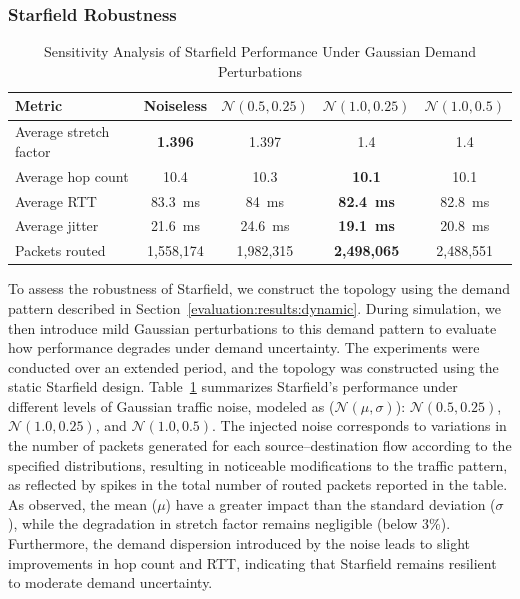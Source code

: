 \documentclass[acmsmall, screen]{acmart}
\begin{document}
\subsubsection{Starfield Robustness}\label{evaluation:results:robustness}
\begin{table}[!t]
\centering
\begin{tabular}{lcccc}
\toprule
Metric & Noiseless & $\mathcal{N}(0.5, 0.25)$ & $\mathcal{N}(1.0, 0.25)$ & $\mathcal{N}(1.0, 0.5)$ \\
\midrule
Average stretch factor & \textbf{1.396} & 1.397 & 1.4 & 1.4 \\
Average hop count & 10.4 & 10.3 & \textbf{10.1} & 10.1 \\
Average RTT & \SI{83.3}{\milli\second} & \SI{84}{\milli\second} & \textbf{\SI{82.4}{\milli\second}} & \SI{82.8}{\milli\second} \\
Average jitter & \SI{21.6}{\milli\second} & \SI{24.6}{\milli\second} & \textbf{\SI{19.1}{\milli\second}} & \SI{20.8}{\milli\second} \\
Packets routed & 1,558,174 & 1,982,315 & \textbf{2,498,065} & 2,488,551  \\
\bottomrule
\end{tabular}
\caption{Sensitivity Analysis of Starfield Performance Under Gaussian Demand Perturbations}
\label{evaluation:results:robustness:performance}
\end{table}

To assess the robustness of Starfield, we construct the topology using the demand pattern described in Section~\ref{evaluation:results:dynamic}. During simulation, we then introduce mild Gaussian perturbations to this demand pattern to evaluate how performance degrades under demand uncertainty. The experiments were conducted over an extended period, and the topology was constructed using the static Starfield design. Table~\ref{evaluation:results:robustness:performance} summarizes Starfield’s performance under different levels of Gaussian traffic noise, modeled as ($\mathcal{N}(\mu, \sigma)$): $\mathcal{N}(0.5, 0.25)$, $\mathcal{N}(1.0, 0.25)$, and $\mathcal{N}(1.0, 0.5)$. The injected noise corresponds to variations in the number of packets generated for each source–destination flow according to the specified distributions, resulting in noticeable modifications to the traffic pattern, as reflected by spikes in the total number of routed packets reported in the table. As observed, the mean ($\mu$) have a greater impact than the standard deviation ($\sigma$), while the degradation in stretch factor remains negligible (below 3\%). Furthermore, the demand dispersion introduced by the noise leads to slight improvements in hop count and RTT, indicating that Starfield remains resilient to moderate demand uncertainty.
\end{document}
